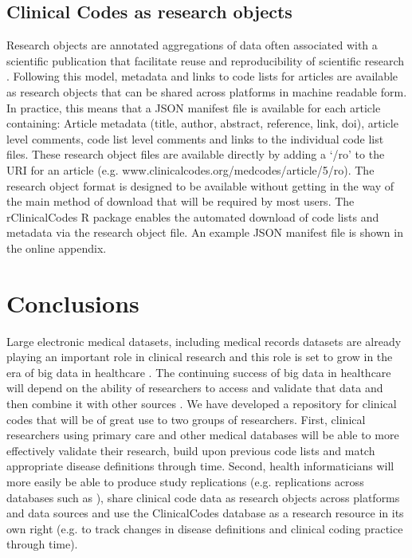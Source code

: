 \documentclass[10pt]{article}
\begin{document}
\subsection*{Clinical Codes as research objects}


Research objects are annotated aggregations of data often associated with a scientific publication that facilitate reuse and reproducibility of scientific research \cite{Bechhofer2010}. Following this model, metadata and links to code lists for articles are available as research objects that can be shared across platforms in machine readable form.  In practice, this means that a JSON manifest file is available for each article containing: Article metadata (title, author, abstract, reference, link, doi), article level comments, code list level comments and links to the individual code list files. These research object files are available directly by adding a `/ro' to the URI for an article (e.g. www.clinicalcodes.org/medcodes/article/5/ro).  The research object format is designed to be available without getting in the way of the main method of download that will be required by most users.  The rClinicalCodes R package \cite{Springate2014} enables the automated download of code lists and metadata via the research object file. An example JSON manifest file is shown in the online appendix.

\section*{Conclusions}


Large electronic medical datasets, including medical records datasets are already playing an important role in clinical research and this role is set to grow in the era of big data in healthcare \cite{Wang2013}. The continuing success of big data in healthcare will depend on the ability of researchers to access and validate that data and then combine it with other sources \cite{Murdoch2013}.  We have developed a repository for clinical codes that will be of great use to two groups of researchers.  First, clinical researchers using primary care and other medical databases will be able to more effectively validate their research, build upon previous code lists and match appropriate disease definitions through time. Second, health informaticians will more easily be able to produce study replications (e.g. replications across databases such as \cite{Reeves2014}), share clinical code data as research objects across platforms and data sources and use the ClinicalCodes database as a research resource in its own right (e.g. to track changes in disease definitions and clinical coding practice through time).
\end{document}
